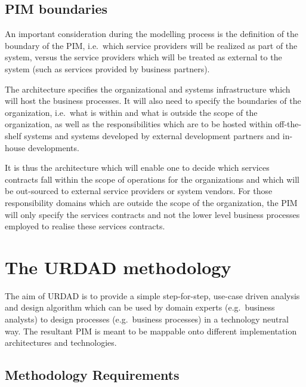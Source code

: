 \documentclass{IOS-Book-Article}
\begin{document}

\subsection{PIM boundaries}

An important consideration during the modelling process is the definition of the
boundary of the PIM, i.e.\ which service providers will be realized as part of the
system, versus the service providers which will be treated as external to the
system (such as services provided by business partners).

The architecture specifies the organizational and systems infrastructure which
will host the business processes. It will also need to specify the boundaries of
the organization, i.e.\ what is within and what is outside the scope of the
organization, as well as the responsibilities which are to be hosted within
off-the-shelf systems and systems developed by external development partners
and in-house developments.

It is thus the architecture which will enable one to decide which
services contracts fall within the scope of operations for the organizations and
which will be out-sourced to external service providers or system vendors. For
those responsibility domains which are outside the scope of the organization,
the PIM will only specify the services contracts and not the lower level
business processes employed to realise these services contracts.


\section{The URDAD methodology}

The aim of URDAD is to provide a simple step-for-step, use-case driven analysis
and design algorithm which can be used by domain experts (e.g.\ business
analysts) to design processes (e.g.\ business processes) in a technology neutral
way. The resultant PIM is meant to be
mappable onto different implementation architectures and technologies.


\subsection{Methodology Requirements}
\end{document}
